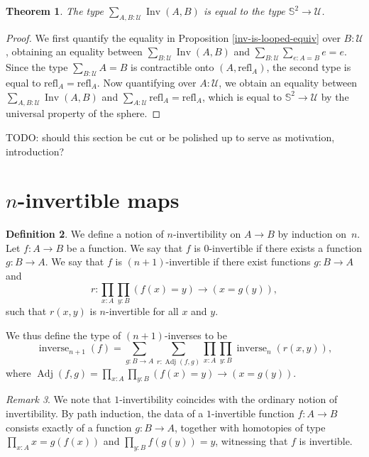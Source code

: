 \documentclass{article}
\theoremstyle{plain}
\newtheorem{theorem}{Theorem}
\theoremstyle{definition}
\newtheorem{definition}[theorem]{Definition}
\theoremstyle{remark}
\newtheorem{remark}[theorem]{Remark}
\newcommand{\refl}{\mathrm{refl}}
\newcommand{\nsphere}[1]{\mathbb{S}^{#1}}
\newcommand{\sphere}{\nsphere{2}}
\newcommand{\U}{\mathcal{U}}
\DeclareMathOperator{\inv}{Inv}
\DeclareMathOperator{\inverse}{inverse}
\DeclareMathOperator{\adj}{Adj}
\newcommand{\ninverse}[1]{\inverse_{#1}}
\begin{document}
\begin{theorem}
  The type \(\sum_{A, B : \U}\inv(A, B)\) is equal to the type \(\sphere \to \U\).
\end{theorem}

\begin{proof}
  We first quantify the equality in Proposition
  \ref{inv-is-looped-equiv} over \(B : \U\), obtaining an equality between
  \(\sum_{B : \U}\inv(A, B)\) and \(\sum_{B : \U}\sum_{e : A = B}e = e\).
  Since the type \(\sum_{B : \U}A = B\) is contractible onto
  \(\left(A, \refl_{A}\right)\), the second type is equal to
  \(\refl_{A} = \refl_{A}\). Now quantifying
  over \(A : \U\), we obtain an equality between \(\sum_{A, B : \U}\inv(A, B)\) and
  \(\sum_{A : \U}\refl_{A} = \refl_{A}\), which is equal to \(\sphere \to \U\) by the
  universal property of the sphere.
\end{proof}

TODO: should this section be cut or be polished up to serve as motivation, introduction?

\section{\(n\)-invertible maps}

\begin{definition}
  We define a notion of \(n\)-invertibility on \(A \to B\) by induction on~\(n\).
  Let \(f : A \to B\) be a function. We say that \(f\) is
  \(0\)-invertible if there exists a function \(g : B \to A\).
  We say that \(f\) is \((n + 1)\)-invertible if there exist functions \(g : B \to A\) and
  \[r : \prod_{x : A}\prod_{y : B}(f(x) = y) \to (x = g(y)),\]
  such that \(r(x, y)\) is \(n\)-invertible for all \(x\) and \(y\).

  We thus define the type of \((n + 1)\)-inverses to be
  \[\ninverse{n + 1}(f) =
    \sum_{g : B \to A}\sum_{r : \adj(f, g)}
    \prod_{x : A}\prod_{y : B}\ninverse{n}(r(x, y)),\]
  where \(\adj(f, g) = \prod_{x : A}\prod_{y : B}(f(x) = y) \to (x = g(y))\).
\end{definition}

\begin{remark}
  We note that \(1\)-invertibility coincides with the ordinary notion of invertibility.
  By path induction, the data of a \(1\)-invertible function \(f : A \to B\)
  consists exactly of a function \(g : B \to A\), together with homotopies of type
  \(\prod_{x : A} x = g(f(x))\) and \(\prod_{y : B} f(g(y)) = y\), witnessing
  that \(f\) is invertible.
\end{remark}
\end{document}
